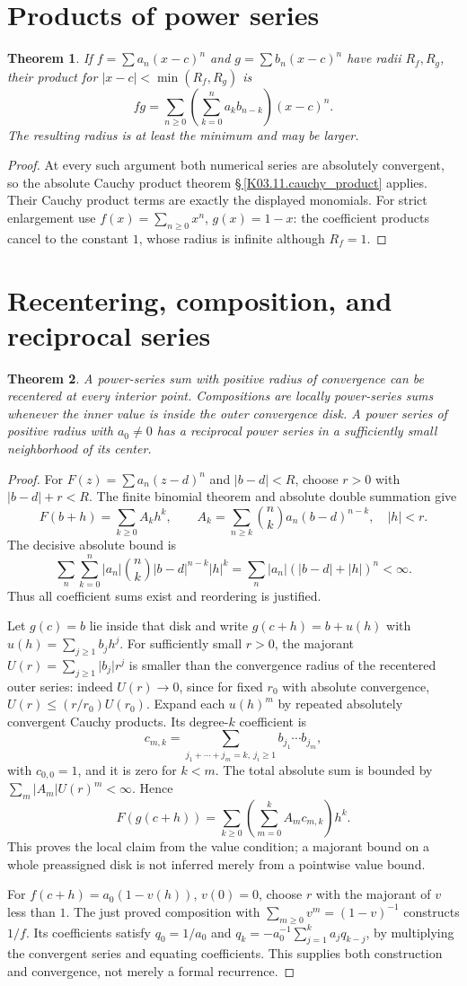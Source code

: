 \documentclass[11pt,oneside,a4paper]{book}
\newtheorem{theorem}{Theorem}[chapter]
\theoremstyle{definition}
\theoremstyle{remark}
\newcommand{\abs}[1]{\lvert#1\rvert}
\newcommand{\KEntry}[2]{\Needspace{7\baselineskip}\section{#2}\label{#1}{\small\sffamily\color{black!60}\detokenize{#1}}\par}
\newcommand{\KRef}[1]{\hyperref[#1]{\S\,\ref*{#1}}}
\begin{document}
\KEntry{K03.13.products}{Products of power series}
\begin{theorem}
If $f=\sum a_n(x-c)^n$ and $g=\sum b_n(x-c)^n$ have radii $R_f,R_g$, their product for $\abs{x-c}<\min(R_f,R_g)$ is
\[fg=\sum_{n\geq0}\left(\sum_{k=0}^na_kb_{n-k}\right)(x-c)^n.\]
The resulting radius is at least the minimum and may be larger.
\end{theorem}
\begin{proof}
At every such argument both numerical series are absolutely convergent, so the absolute Cauchy product theorem \KRef{K03.11.cauchy_product} applies. Their Cauchy product terms are exactly the displayed monomials. For strict enlargement use $f(x)=\sum_{n\geq0}x^n$, $g(x)=1-x$: the coefficient products cancel to the constant $1$, whose radius is infinite although $R_f=1$.
\end{proof}

\KEntry{K03.13.composition}{Recentering, composition, and reciprocal series}
\begin{theorem}
A power-series sum with positive radius of convergence can be recentered at every interior point. Compositions are locally power-series sums whenever the inner value is inside the outer convergence disk. A power series of positive radius with $a_0\ne0$ has a reciprocal power series in a sufficiently small neighborhood of its center.
\end{theorem}
\begin{proof}
For $F(z)=\sum a_n(z-d)^n$ and $\abs{b-d}<R$, choose $r>0$ with $\abs{b-d}+r<R$. The finite binomial theorem and absolute double summation give
\[F(b+h)=\sum_{k\geq0}A_kh^k,\qquad A_k=\sum_{n\geq k}\binom nk a_n(b-d)^{n-k},\quad \abs h<r.\]
The decisive absolute bound is
\[\sum_n\sum_{k=0}^n\abs{a_n}\binom nk\abs{b-d}^{n-k}\abs h^k=\sum_n\abs{a_n}(\abs{b-d}+\abs h)^n<\infty.\]
Thus all coefficient sums exist and reordering is justified.

Let $g(c)=b$ lie inside that disk and write $g(c+h)=b+u(h)$ with $u(h)=\sum_{j\geq1}b_jh^j$. For sufficiently small $r>0$, the majorant $U(r)=\sum_{j\geq1}\abs{b_j}r^j$ is smaller than the convergence radius of the recentered outer series: indeed $U(r)\to0$, since for fixed $r_0$ with absolute convergence, $U(r)\leq(r/r_0)U(r_0)$. Expand each $u(h)^m$ by repeated absolutely convergent Cauchy products. Its degree-$k$ coefficient is
\[c_{m,k}=\sum_{j_1+\cdots+j_m=k,\ j_i\geq1}b_{j_1}\cdots b_{j_m},\]
with $c_{0,0}=1$, and it is zero for $k<m$. The total absolute sum is bounded by $\sum_m\abs{A_m}U(r)^m<\infty$. Hence
\[F(g(c+h))=\sum_{k\geq0}\left(\sum_{m=0}^kA_mc_{m,k}\right)h^k.\]
This proves the local claim from the value condition; a majorant bound on a whole preassigned disk is not inferred merely from a pointwise value bound.

For $f(c+h)=a_0(1-v(h))$, $v(0)=0$, choose $r$ with the majorant of $v$ less than $1$. The just proved composition with $\sum_{m\geq0}v^m=(1-v)^{-1}$ constructs $1/f$. Its coefficients satisfy $q_0=1/a_0$ and $q_k=-a_0^{-1}\sum_{j=1}^ka_jq_{k-j}$, by multiplying the convergent series and equating coefficients. This supplies both construction and convergence, not merely a formal recurrence.
\end{proof}
\end{document}
